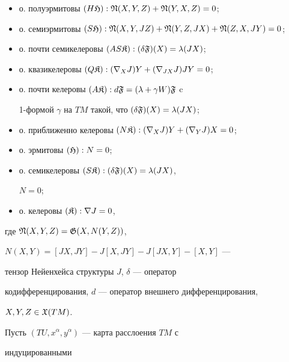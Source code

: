 \begin{itemize} 


\item[(1)] о. полуэрмитовы $(H\frak H):\frak N(X,Y,Z)+\frak N(Y,X,Z)=0$; 


\item[(2)] о. семиэрмитовы $(S\frak H):\frak N(X,Y,JZ)+\frak 


N(Y,Z,JX)+\frak N(Z,X,JY)=0$; 


\item[(3)] о. почти семикелеровы $(AS\frak K):(\delta\frak 


F)(X)=\lambda(JX)$; 


\item[(4)] о. квазикелеровы $(Q\frak K):(\nabla_X J)Y+(\nabla_{JX} 


J)JY=0$; 


\item[(5)] о. почти келеровы $(A\frak K):d\frak F=(\lambda+\gamma 


W)\frak F$ c 


1-формой $\gamma$ на $TM$ такой, что $(\delta\frak F)(X)=\lambda(JX)$; 


\item[(6)] о. приближенно келеровы $(N\frak K):(\nabla_X J)Y+(\nabla_Y 


J)X=0$; 


\item[(7)] о. эрмитовы $(\frak H):N=0$; 


\item[(8)] о. семикелеровы $(S\frak K):(\delta\frak F)(X)=\lambda(JX)$, 


$N=0$; 


\item[(9)] о. келеровы $(\frak K):\nabla J=0$, 


\end{itemize} 


где $\frak N(X,Y,Z)=\frak G(X,N(Y,Z))$, 


$N(X,Y)=[JX,JY]-J[X,JY]-J[JX,Y]-[X,Y]$ --- 


тензор Нейенхейса структуры $J$, $\delta$ --- оператор 


кодифференцирования, $d$ --- оператор внешнего дифференцирования, 


$X,Y,Z\in\frak X(TM)$. 


 


Пусть $(TU,x^\alpha,y^\alpha)$ --- карта расслоения $TM$ с 


индуцированными  


